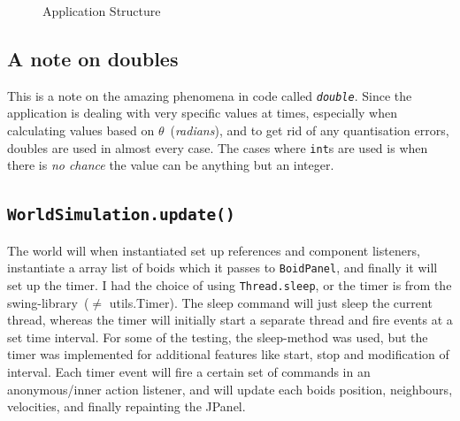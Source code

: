 \documentclass[a4paper,twoside, 10pt]{report}
\newcommand{\code}[1]{\texttt{#1}}
\begin{document}
\begin{figure}[H]
  \caption{Application Structure}
  \label{fig:applicationStructure}
  \abovecaptionskip
  \belowcaptionskip
\end{figure}

\subsection{A note on doubles}
\label{subsec:doubles}
This is a note on the amazing phenomena in code called \textit{\code{double}}. Since the application is dealing with very specific values at times, especially when calculating values based on $\theta$~(\textit{radians}), and to get rid of any quantisation errors, doubles are used in almost every case. The cases where \code{int}s are used is when there is \textit{no chance} the value can be anything but an integer.

\subsection{\code{WorldSimulation.update()}}
\label{subsec:update}
The world will when instantiated set up references and component listeners, instantiate a array list of boids which it passes to \code{BoidPanel}, and finally it will set up the timer. I had the choice of using \code{Thread.sleep}, or the timer is from the swing-library~($\neq$ utils.Timer). The sleep command will just sleep the current thread, whereas the timer will initially start a separate thread and fire events at a set time interval. For some of the testing, the sleep-method was used, but the timer was implemented for additional features like start, stop and modification of interval. Each timer event will fire a certain set of commands in an anonymous/inner action listener, and will update each boids position, neighbours, velocities, and finally repainting the JPanel. 
\end{document}
